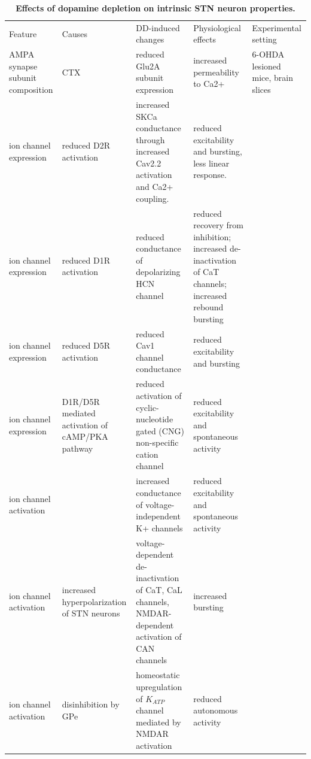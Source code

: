 %
%
%
\begin{table} %
\centering
\caption{{\bf Effects of dopamine depletion on intrinsic STN neuron properties.}}
\begin{adjustbox}{height=0.3\textheight}
\begin{tabular}{p{0.1\textheight}p{0.1\textheight}p{0.2\textheight}p{0.2\textheight}p{0.3\textheight}}%
\toprule
Feature & Causes & DD-induced changes & Physiological effects & Experimental setting \\
AMPA synapse subunit composition & CTX & reduced Glu2A subunit expression & increased permeability to Ca2+ & 6-OHDA lesioned mice, brain slices \cite{chu_loss_2017} \\
ion channel expression & reduced D2R activation & increased SKCa conductance through increased Cav2.2 activation and Ca2+ coupling. & reduced excitability and bursting, less linear response. & \cite{ramanathan_d2-like_2008} \\
ion channel expression & reduced D1R activation & reduced conductance of depolarizing HCN channel & reduced recovery from inhibition; increased de-inactivation of CaT channels; increased rebound bursting & \cite{loucif_depolarisation_2008,yang_d2_2016,baufreton_d2-like_2008,zhu_pharmacological_2002,shen_synaptic_2003,atherton_selective_2010,baufreton_d5_2003,floran_dopamine_2004} \\
ion channel expression & reduced D5R activation & reduced Cav1 channel conductance & reduced excitability and bursting & \cite{baufreton_d5_2003,chetrit_inhibiting_2013}
\\
ion channel expression & D1R/D5R mediated activation of cAMP/PKA pathway & reduced activation of cyclic-nucleotide gated (CNG) non-specific cation channel & reduced excitability and spontaneous activity & \cite{loucif_depolarisation_2008}
\\
ion channel activation & & increased conductance of voltage-independent K+ channels & reduced excitability and spontaneous activity & \cite{zhu_pharmacological_2002} \\
ion channel activation & increased hyperpolarization of STN neurons & voltage-dependent de-inactivation of CaT, CaL channels, NMDAR-dependent activation of CAN channels & increased bursting & \cite{beurrier_subthalamic_1999,zhu_nmda_2005} \\
ion channel activation & disinhibition by GPe & homeostatic upregulation of $K_{ATP}$ channel mediated by NMDAR activation & reduced autonomous activity & \cite{mciver_maladaptive_2019} \\
\bottomrule
\end{tabular}
\end{adjustbox}
\label{tab:dd-intracellular_stn}
\end{table} %
%

